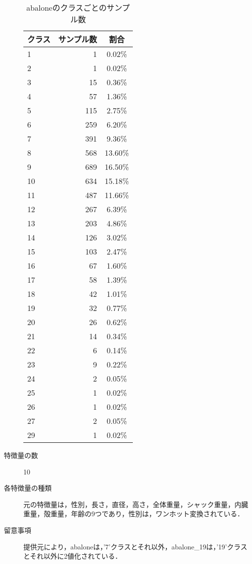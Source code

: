 \begin{description}
    \begin{table}[htbp]
        \centering
        \caption{abaloneのクラスごとのサンプル数}
        \label{tab:abalone}
        \begin{tabular}{lrc} \hline
            \multicolumn{1}{c}{クラス} &
            \multicolumn{1}{c}{サンプル数} &
            \multicolumn{1}{c}{割合} \\
            \hline
            \hline
            1 & 1 & 0.02\% \\
            2 & 1 & 0.02\% \\
            3 & 15 & 0.36\% \\
            4 & 57 & 1.36\% \\
            5 & 115 & 2.75\% \\
            6 & 259 & 6.20\% \\
            7 & 391 & 9.36\% \\
            8 & 568 & 13.60\% \\
            9 & 689 & 16.50\% \\
            10 & 634 & 15.18\% \\
            11 & 487 & 11.66\% \\
            12 & 267 & 6.39\% \\
            13 & 203 & 4.86\% \\
            14 & 126 & 3.02\% \\
            15 & 103 & 2.47\% \\
            16 & 67 & 1.60\% \\
            17 & 58 & 1.39\% \\
            18 & 42 & 1.01\% \\
            19 & 32 & 0.77\% \\
            20 & 26 & 0.62\% \\
            21 & 14 & 0.34\% \\
            22 & 6 & 0.14\% \\
            23 & 9 & 0.22\% \\
            24 & 2 & 0.05\% \\
            25 & 1 & 0.02\% \\
            26 & 1 & 0.02\% \\
            27 & 2 & 0.05\% \\
            29 & 1 & 0.02\% \\
            \hline
        \end{tabular}
    \end{table}

    \item[特徴量の数] 10
    \item[各特徴量の種類] \mbox{}
        元の特徴量は，性別，長さ，直径，高さ，全体重量，シャック重量，内臓重量，殻重量，年齢の9つであり，性別は，ワンホット変換されている．
    \item[留意事項] 提供元により，abaloneは，'7'クラスとそれ以外，abalone\_19は，'19'クラスとそれ以外に2値化されている．
\end{description}


